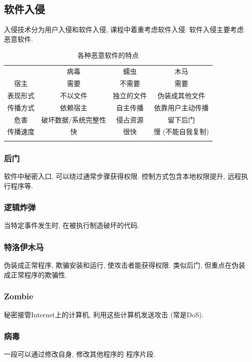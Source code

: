 \documentclass{ctexart}
\newlength{\Oldarrayrulewidth}
\newcommand{\Hline}[1]{
  \noalign{\global\setlength{\Oldarrayrulewidth}{\arrayrulewidth}}
  \noalign{\global\setlength{\arrayrulewidth}{#1}}\hline
  \noalign{\global\setlength{\arrayrulewidth}{\Oldarrayrulewidth}}}
\newcommand{\Topline}{\Hline{0.08em}}
\newcommand{\Bottomline}{\Hline{0.08em}}
\newcommand{\Midline}{\Hline{0.05em}}
\begin{document}
\subsection{软件入侵}
    入侵技术分为用户入侵和软件入侵, 课程中着重考虑软件入侵. 软件入侵主要考虑恶意软件.
    \begin{table}[ht!]
        \centering
    \begin{tabularx}{\textwidth}{|C|C|C|C|}
        \Topline
                 & 病毒                & 蠕虫       & 木马              \\
        \Midline
        宿主     & 需要                & 不需要     & 需要              \\
        \Midline
        表现形式 & 不以文件            & 独立的文件 & 伪装成其他文件    \\
        \Midline
        传播方式 & 依赖宿主            & 自主传播   & 依靠用户主动传播  \\
        \Midline
        危害     & 破坏数据/系统完整性 & 侵占资源   & 留下后门          \\
        \Midline
        传播速度 & 快                  & 很快       & 慢 (不能自我复制) \\
        \Bottomline
    \end{tabularx}
        \caption{各种恶意软件的特点}
    \end{table}
\subsubsection{后门}
    软件中秘密入口, 可以绕过通常步骤获得权限.
    控制方式包含本地权限提升, 远程执行程序等.
\subsubsection{逻辑炸弹}
    当特定事件发生时, 在被执行制造破坏的代码.
\subsubsection{特洛伊木马}
    伪装成正常程序, 欺骗安装和运行, 使攻击者能获得权限.
    类似后门, 但重点在伪装成正常程序的欺骗性.
\subsubsection{Zombie}
    秘密接管Internet上的计算机, 利用这些计算机发送攻击 (常是DoS).
\subsubsection{病毒}
    一段可以通过修改自身, 修改其他程序的 程序片段.
\end{document}
